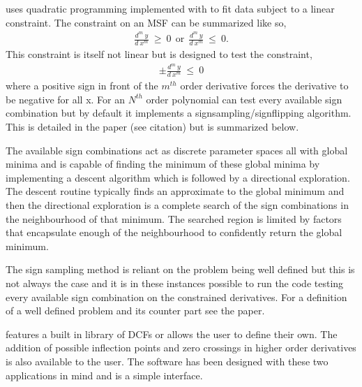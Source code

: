 \documentclass[letterpaper,10pt,english]{sphinxmanual}
\begin{document}
 uses quadratic programming implemented with  to fit
data subject to a linear constraint. The constraint on an MSF can be
summarized like so,
\begin{equation*}
\begin{split}\frac{d^m~y}{d~x^m}~\geq~0~~\mathrm{or}~~\frac{d^m~y}{d~x^m}~\leq~0.\end{split}
\end{equation*}
This constraint is itself not linear but  is designed to test the
constraint,
\begin{equation*}
\begin{split}\pm \frac{d^m~y}{d~x^m}~\leq~0\end{split}
\end{equation*}
where a positive sign in front of the \(m^{th}\) order derivative forces the derivative
to be negative for all x. For an \(N^{th}\) order polynomial  can test
every available sign combination but by default it implements a \textquotesingle{}sign\sphinxhyphen{}sampling\textquotesingle{}/\textquotesingle{}sign\sphinxhyphen{}flipping\textquotesingle{}
algorithm. This is detailed in the  paper (see citation) but is summarized
below.

The available sign combinations act as discrete parameter spaces all with
global minima and  is capable of finding the minimum of these global
minima by implementing a descent algorithm which is followed by a directional
exploration. The descent routine typically finds an approximate to the global
minimum and then the directional exploration is a complete search
of the sign combinations in the neighbourhood
of that minimum. The searched region is limited by factors
that encapsulate enough of the neighbourhood to confidently return the global minimum.

The sign sampling method is reliant on the problem being \textquotesingle{}well defined\textquotesingle{} but this
is not always the case and it is in these instances possible to run the code testing
every available sign combination on the constrained derivatives. For a definition of
a \textquotesingle{}well defined\textquotesingle{} problem and it\textquotesingle{}s counter part see the  paper.

 features a built in library of DCFs or
allows the user to define their own. The addition of possible inflection points
and zero crossings in higher order derivatives is also available to the user.
The software has been designed with these two
applications in mind and is a simple interface.
\end{document}
